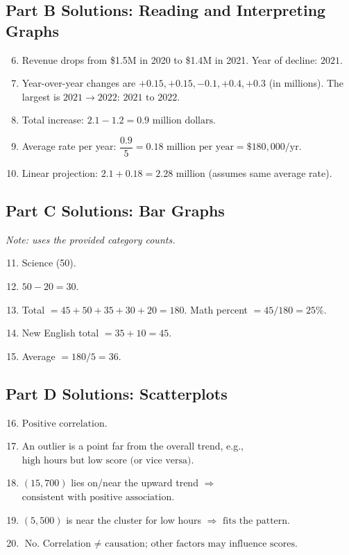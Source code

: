 \documentclass[14pt]{extarticle}
\begin{document}
\subsection*{Part B Solutions: Reading and Interpreting Graphs}
\begin{enumerate}
  \setcounter{enumi}{5}
  \item Revenue drops from \$1.5M in 2020 to \$1.4M in 2021. Year of decline: \(\boxed{2021}\).
  \item Year-over-year changes are \(+0.15, +0.15, -0.1, +0.4, +0.3\) (in millions). The largest is \(2021 \to 2022\): \(\boxed{2021 \text{ to } 2022}\).
  \item Total increase: \(2.1-1.2=\boxed{0.9\text{ million dollars}}\).
  \item Average rate per year: \(\dfrac{0.9}{5}=\boxed{0.18\text{ million per year}}=\boxed{\$180{,}000/\text{yr}}\).
  \item Linear projection: \(2.1+0.18=\boxed{2.28\text{ million}}\) (assumes same average rate).
\end{enumerate}

\subsection*{Part C Solutions: Bar Graphs}
\textit{Note: uses the provided category counts.}
\begin{enumerate}
  \setcounter{enumi}{10}
  \item \(\boxed{\text{Science}}\) (50).
  \item \(50-20=\boxed{30}\).
  \item Total \(=45+50+35+30+20=180\). Math percent \(=45/180= \boxed{25\%}\).
  \item New English total \(=35+10=\boxed{45}\).
  \item Average \(=180/5=\boxed{36}\).
\end{enumerate}

\subsection*{Part D Solutions: Scatterplots}
\begin{enumerate}
  \setcounter{enumi}{15}
  \item \(\boxed{\text{Positive correlation}}\).
  \item An outlier is a point far from the overall trend, e.g., \(\boxed{\text{high hours but low score (or vice versa)}}\).
  \item \((15,700)\) lies on/near the upward trend \(\Rightarrow\) \(\boxed{\text{consistent with positive association}}\).
  \item \((5,500)\) is near the cluster for low hours \(\Rightarrow\) \(\boxed{\text{fits the pattern}}\).
  \item \(\boxed{\text{No. Correlation }\neq\text{ causation; other factors may influence scores.}}\)
\end{enumerate}
\end{document}
